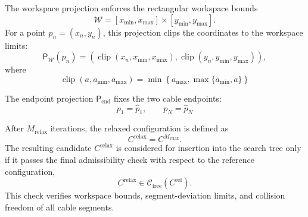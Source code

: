 \documentclass{pas}
\begin{document}

The workspace projection enforces the rectangular workspace bounds
\[
\mathcal{W}
=
[x_{\min},x_{\max}]
\times
[y_{\min},y_{\max}] .
\]
For a point \(p_n=(x_n,y_n)\), this projection clips the coordinates to the
workspace limits:
\begin{equation}
\mathsf{P}_{\mathcal{W}}(p_n)
=
\left(
\operatorname{clip}(x_n,x_{\min},x_{\max}),
\operatorname{clip}(y_n,y_{\min},y_{\max})
\right),
\label{eq:relaxation_workspace_projection}
\end{equation}
where
\begin{equation}
\operatorname{clip}(a,a_{\min},a_{\max})
=
\min
\left\{
a_{\max},
\max\{a_{\min},a\}
\right\}
\label{eq:relaxation_clip_operator}
\end{equation}

The endpoint projection \(\mathsf{P}_{\mathrm{end}}\) fixes the two cable endpoints:
\begin{equation}
p_1=\widehat{p}_1,
\qquad
p_N=\widehat{p}_N
\label{eq:relaxation_endpoint_constraint}
\end{equation}

After \(M_{\mathrm{relax}}\) iterations, the relaxed configuration is defined as
\begin{equation}
C^{\mathrm{relax}}=C^{M_{\mathrm{relax}}}.
\label{eq:relaxed_configuration_result}
\end{equation}
The resulting candidate \(C^{\mathrm{relax}}\) is considered for insertion into the search tree only if it passes the final admissibility check with respect to the reference configuration,
\begin{equation}
C^{\mathrm{relax}}\in\mathcal{C}_{\mathrm{free}}(C^{\mathrm{ref}}).
\label{eq:relaxed_static_validation}
\end{equation}
This check verifies workspace bounds, segment-deviation limits, and collision
freedom of all cable segments.
\end{document}
